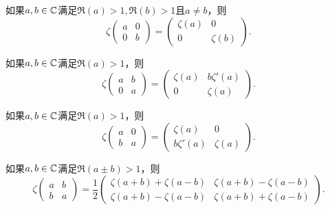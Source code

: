 \begin{mybox}
  \begin{corollary}[特殊矩阵的zeta函数]
    \begin{enum}
      \item 如果$a,b\in\mathbb C$满足$\Re(a)>1,\Re(b)>1$且$a\ne b$，则
          \[
            \zeta\begin{pmatrix}
              a & 0 \\
              0 & b
            \end{pmatrix} = \begin{pmatrix}
              \zeta(a) & 0 \\
              0 & \zeta(b)
            \end{pmatrix}.
          \]
      \item\label{coro4.9b} 如果$a,b\in\mathbb C$满足$\Re(a)>1$，则
          \[
            \zeta \begin{pmatrix}
              a & b \\
              0 & a
            \end{pmatrix} = \begin{pmatrix}
              \zeta(a) & b\zeta'(a) \\
              0 & \zeta(a)
            \end{pmatrix}.
          \]
      \item 如果$a,b\in\mathbb C$满足$\Re(a)>1$，则
          \[
            \zeta \begin{pmatrix}
              a & 0 \\
              b & a
            \end{pmatrix} = \begin{pmatrix}
              \zeta(a) & 0 \\
              b\zeta'(a) & \zeta(a)
            \end{pmatrix}.
          \]
      \item 如果$a,b\in\mathbb C$满足$\Re(a\pm b)>1$，则
          \[
            \zeta \begin{pmatrix}
              a & b \\
              b & a
            \end{pmatrix} = \frac12 \begin{pmatrix}
              \zeta(a+b) + \zeta(a-b) & \zeta(a+b) - \zeta(a-b) \\
              \zeta(a+b) - \zeta(a-b) & \zeta(a+b) + \zeta(a-b)
            \end{pmatrix}.
          \]
    \end{enum}
  \end{corollary}
\end{mybox}

